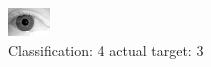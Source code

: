 \begin{figure}[h!]
\begin{center}
\includegraphics[width=0.60\columnwidth]{figures/ID2119_class_4_target_3.png}
\end{center}
\caption{ Classification: 4 actual target: 3}
\label{fig:ID2119_class_4_target_3}
\end{figure}
